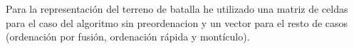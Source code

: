 Para la representación del terreno de batalla he utilizado una matriz de celdas para el caso del algoritmo sin preordenacion y un vector para el resto de casos (ordenación por fusión, ordenación rápida y montículo).